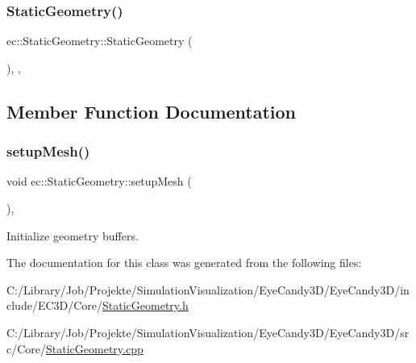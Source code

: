 \subsubsection{\texorpdfstring{Static\+Geometry()}{StaticGeometry()}}
{\footnotesize\ttfamily ec\+::\+Static\+Geometry\+::\+Static\+Geometry (\begin{DoxyParamCaption}{ }\end{DoxyParamCaption})\hspace{0.3cm}{\ttfamily [explicit]}, {\ttfamily [protected]}, {\ttfamily [default]}}



\subsection{Member Function Documentation}
\mbox{\label{classec_1_1_static_geometry_a971d3c59c50d0ae540b95ecb77d5a05a}} 
\subsubsection{\texorpdfstring{setup\+Mesh()}{setupMesh()}}
{\footnotesize\ttfamily void ec\+::\+Static\+Geometry\+::setup\+Mesh (\begin{DoxyParamCaption}{ }\end{DoxyParamCaption})\hspace{0.3cm}{\ttfamily [protected]}, {\ttfamily [virtual]}}



Initialize geometry buffers. 



The documentation for this class was generated from the following files\+:\begin{DoxyCompactItemize}
\item 
C\+:/\+Library/\+Job/\+Projekte/\+Simulation\+Visualization/\+Eye\+Candy3\+D/\+Eye\+Candy3\+D/include/\+E\+C3\+D/\+Core/\mbox{\hyperlink{_static_geometry_8h}{Static\+Geometry.\+h}}\item 
C\+:/\+Library/\+Job/\+Projekte/\+Simulation\+Visualization/\+Eye\+Candy3\+D/\+Eye\+Candy3\+D/src/\+Core/\mbox{\hyperlink{_static_geometry_8cpp}{Static\+Geometry.\+cpp}}\end{DoxyCompactItemize}
